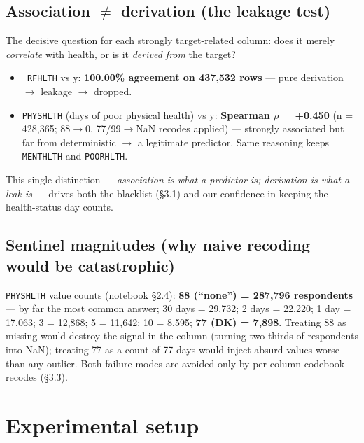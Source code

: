 \documentclass[11pt,a4paper]{article}
\providecommand{\tightlist}{\setlength{\itemsep}{2pt}\setlength{\parskip}{0pt}}
\begin{document}
{\subsection{Association $\neq$ derivation (the leakage test)}\label{association-derivation-the-leakage-test}

The decisive question for each strongly target-related column: does it merely \emph{correlate} with health, or is it \emph{derived from} the target?

\begin{itemize}
\tightlist
\item
  \texttt{\_RFHLTH} vs y: \textbf{100.00\% agreement on 437,532 rows} --- pure derivation $\rightarrow$ leakage $\rightarrow$ dropped.
\item
  \texttt{PHYSHLTH} (days of poor physical health) vs y: \textbf{Spearman $\rho$ = +0.450} (n = 428,365; 88$\rightarrow$0, 77/99$\rightarrow$NaN recodes applied) --- strongly associated but far from deterministic $\rightarrow$ a legitimate predictor. Same reasoning keeps \texttt{MENTHLTH} and \texttt{POORHLTH}.
\end{itemize}

This single distinction --- \emph{association is what a predictor is; derivation is what a leak is} --- drives both the blacklist (\S{}3.1) and our confidence in keeping the health-status day counts.

\subsection{Sentinel magnitudes (why naive recoding would be catastrophic)}\label{sentinel-magnitudes-why-naive-recoding-would-be-catastrophic}

\texttt{PHYSHLTH} value counts (notebook \S{}2.4): \textbf{88 (``none'') = 287,796 respondents} --- by far the most common answer; 30 days = 29,732; 2 days = 22,220; 1 day = 17,063; 3 = 12,868; 5 = 11,642; 10 = 8,595; \textbf{77 (DK) = 7,898}. Treating 88 as missing would destroy the signal in the column (turning two thirds of respondents into NaN); treating 77 as a count of 77 days would inject absurd values worse than any outlier. Both failure modes are avoided only by per-column codebook recodes (\S{}3.3).

\section{Experimental setup}\label{experimental-setup}

}
\end{document}
